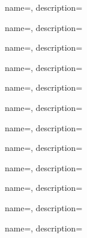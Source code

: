 {
  name={\DEph},
  description={\DEph{}}
}

{
  name={\DEph},
  description={\DEph{}}
}

{
  name={\DEph},
  description={\DEph{}}
}

{
  name={\DEph},
  description={\DEph{}}
}

{
  name={\DEph},
  description={\DEph{}}
}

{
  name={\DEph},
  description={\DEph{}}
}

{
  name={\DEph},
  description={\DEph{}}
}

{
  name={\DEph},
  description={\DEph{}}
}

{
  name={\DEph},
  description={\DEph{}}
}

{
  name={\DEph},
  description={\DEph{}}
}

{
  name={\DEph},
  description={\DEph{}}
}

{
  name={\DEph},
  description={\DEph{}}
}



